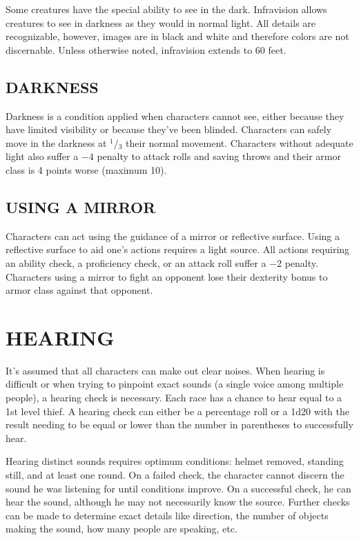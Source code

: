 \begin{multicols}{2}
Some creatures have the special ability to see in the dark.  Infravision allows creatures to see in darkness as they would in normal light.  All details are recognizable, however, images are in black and white and therefore colors are not discernable.  Unless otherwise noted, infravision extends to 60 feet.

\subsection{DARKNESS}

Darkness is a condition applied when characters cannot see, either because they have limited visibility or because they've been blinded.  Characters can safely move in the darkness at $^1$/$_3$ their normal movement.  Characters without adequate light also suffer a $-4$ penalty to attack rolls and saving throws and their armor class is 4 points worse (maximum 10).  

\subsection{USING A MIRROR}

Characters can act using the guidance of a mirror or reflective surface.  Using a reflective surface to aid one's actions requires a light source.  All actions requiring an ability check, a proficiency check, or an attack roll suffer a $-2$ penalty.  Characters using a mirror to fight an opponent lose their dexterity bonus to armor class against that opponent.
 
\section{HEARING}

It's assumed that all characters can make out clear noises.  When hearing is difficult or when trying to pinpoint exact sounds (a single voice among multiple people), a hearing check is necessary.  Each race has a chance to hear equal to a 1st level thief.  A hearing check can either be a percentage roll or a 1d20 with the result needing to be equal or lower than the number in parentheses to successfully hear.

Hearing distinct sounds requires optimum conditions: helmet removed, standing still, and at least one round.  On a failed check, the character cannot discern the sound he was listening for until conditions improve.  On a successful check, he can hear the sound, although he may not necessarily know the source.  Further checks can be made to determine exact details like direction, the number of objects making the sound, how many people are speaking, etc.


\end{multicols}
